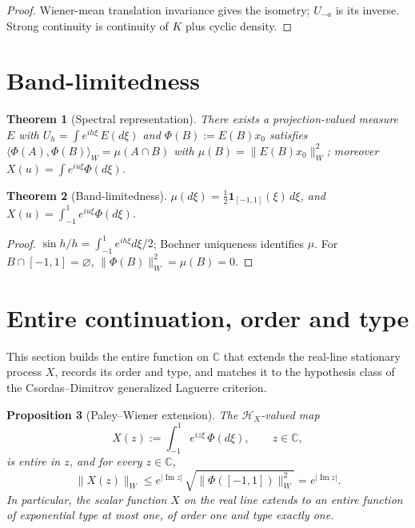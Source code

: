 \documentclass[11pt,reqno]{amsart}
\theoremstyle{plain}
\newtheorem{theorem}{Theorem}[section]
\newtheorem{proposition}[theorem]{Proposition}
\theoremstyle{definition}
\theoremstyle{remark}
\newcommand{\Hc}{\mathcal H}
\newcommand{\C}{\mathbb C}
\begin{document}
\begin{proof}
Wiener-mean translation invariance gives the isometry; \(U_{-a}\) is its
inverse. Strong continuity is continuity of \(K\) plus cyclic density.
\end{proof}

\section{Band-limitedness}

\begin{theorem}[Spectral representation]\label{thm:spectral}
There exists a projection-valued measure \(E\) with \(U_h=\int e^{ih\xi}\,E(d\xi)\)
and \(\Phi(B):=E(B)x_0\) satisfies
\(\langle\Phi(A),\Phi(B)\rangle_W=\mu(A\cap B)\) with \(\mu(B)=\|E(B)x_0\|_W^2\);
moreover \(X(u)=\int e^{iu\xi}\Phi(d\xi)\).
\end{theorem}

\begin{theorem}[Band-limitedness]\label{thm:bandlimited}
\(\mu(d\xi)=\tfrac12\mathbf 1_{[-1,1]}(\xi)\,d\xi\), and
\(X(u)=\int_{-1}^{1}e^{iu\xi}\Phi(d\xi)\).
\end{theorem}

\begin{proof}
\(\sin h/h=\int_{-1}^{1}e^{ih\xi}d\xi/2\); Bochner uniqueness identifies
\(\mu\). For \(B\cap[-1,1]=\varnothing\), \(\|\Phi(B)\|_W^2=\mu(B)=0\).
\end{proof}

\section{Entire continuation, order and type}

This section builds the entire function on \(\C\) that extends the real-line
stationary process \(X\), records its order and type, and matches it to the
hypothesis class of the Csordas--Dimitrov generalized Laguerre criterion.

\begin{proposition}[Paley--Wiener extension]\label{prop:PW}
The \(\Hc_X\)-valued map
\[
X(z):=\int_{-1}^{1}e^{iz\xi}\,\Phi(d\xi),\qquad z\in\C,
\]
is entire in \(z\), and for every \(z\in\C\),
\[
\|X(z)\|_W\le e^{|\operatorname{Im}z|}\,\sqrt{\|\Phi([-1,1])\|_W^2}
=e^{|\operatorname{Im}z|}.
\]
In particular, the scalar function \(X\) on the real line extends to an
entire function of exponential type at most one, of order one and type
exactly one.
\end{proposition}
\end{document}
